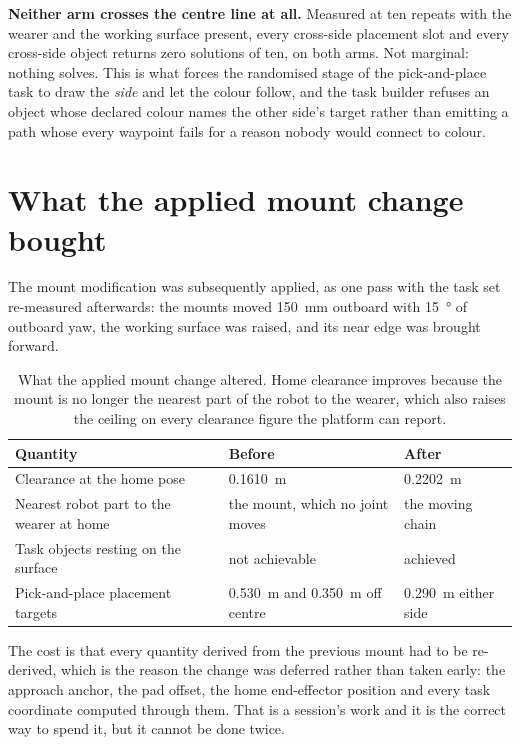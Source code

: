 \textbf{Neither arm crosses the centre line at all.} Measured at ten repeats
with the wearer and the working surface present, every cross-side placement
slot and every cross-side object returns zero solutions of ten, on both arms.
Not marginal: nothing solves. This is what forces the randomised stage of the
pick-and-place task to draw the \emph{side} and let the colour follow, and the
task builder refuses an object whose declared colour names the other side's
target rather than emitting a path whose every waypoint fails for a reason
nobody would connect to colour.

\section{What the applied mount change bought}
\label{sec:mount-applied}

The mount modification was subsequently applied, as one pass with the task set
re-measured afterwards: the mounts moved \SI{150}{\milli\metre} outboard with
\SI{15}{\degree} of outboard yaw, the working surface was raised, and its near
edge was brought forward.

\begin{table}[htbp]
  \centering
  \caption[Before and after the mount change]{What the applied mount change
  altered. Home clearance improves because the mount is no longer the nearest
  part of the robot to the wearer, which also raises the ceiling on every
  clearance figure the platform can report.}
  \label{tab:mountapplied}
  \begin{tabular}{@{}lll@{}}
    \toprule
    Quantity & Before & After \\
    \midrule
    Clearance at the home pose & \SI{0.1610}{\metre} & \SI{0.2202}{\metre} \\
    Nearest robot part to the wearer at home & the mount, which no joint moves
      & the moving chain \\
    Task objects resting on the surface & not achievable & achieved \\
    Pick-and-place placement targets & \SI{0.530}{\metre} and
      \SI{0.350}{\metre} off centre & \SI{0.290}{\metre} either side \\
    \bottomrule
  \end{tabular}
\end{table}

The cost is that every quantity derived from the previous mount had to be
re-derived, which is the reason the change was deferred rather than taken
early: the approach anchor, the pad offset, the home end-effector position and
every task coordinate computed through them. That is a session's work and it
is the correct way to spend it, but it cannot be done twice.

